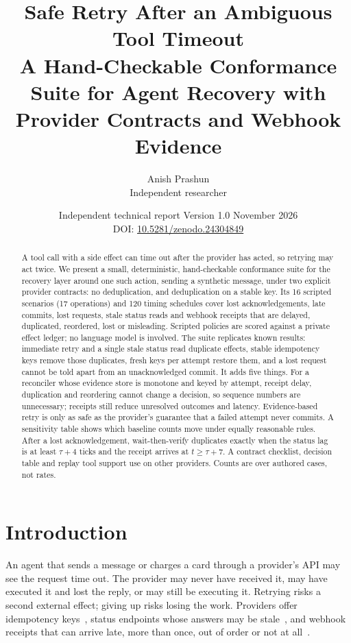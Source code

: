 \documentclass[11pt]{article}
\title{Safe Retry After an Ambiguous Tool Timeout\\[4pt]
\large A Hand-Checkable Conformance Suite for Agent Recovery with Provider Contracts and Webhook Evidence}
\author{Anish Prashun\\ \small Independent researcher}
\date{Independent technical report \quad Version 1.0 \quad November 2026\\[2pt] \small DOI: \href{https://doi.org/10.5281/zenodo.24304849}{10.5281/zenodo.24304849}}
\begin{document}
\maketitle

\begin{abstract}
A tool call with a side effect can time out after the provider has acted, so retrying may act twice. We present a small, deterministic, hand-checkable conformance suite for the recovery layer around one such action, sending a synthetic message, under two explicit provider contracts: no deduplication, and deduplication on a stable key. Its 16 scripted scenarios (17 operations) and 120 timing schedules cover lost acknowledgements, late commits, lost requests, stale status reads and webhook receipts that are delayed, duplicated, reordered, lost or misleading. Scripted policies are scored against a private effect ledger; no language model is involved. The suite replicates known results: immediate retry and a single stale status read duplicate effects, stable idempotency keys remove those duplicates, fresh keys per attempt restore them, and a lost request cannot be told apart from an unacknowledged commit. It adds five things. For a reconciler whose evidence store is monotone and keyed by attempt, receipt delay, duplication and reordering cannot change a decision, so sequence numbers are unnecessary; receipts still reduce unresolved outcomes and latency. Evidence-based retry is only as safe as the provider's guarantee that a failed attempt never commits. A sensitivity table shows which baseline counts move under equally reasonable rules. After a lost acknowledgement, wait-then-verify duplicates exactly when the status lag is at least $\tau+4$ ticks and the receipt arrives at $t \geq \tau+7$. A contract checklist, decision table and replay tool support use on other providers. Counts are over authored cases, not rates.
\end{abstract}

\section{Introduction}\label{sec:intro}

An agent that sends a message or charges a card through a provider's API may see the request time out. The provider may never have received it, may have executed it and lost the reply, or may still be executing it. Retrying risks a second external effect; giving up risks losing the work. Providers offer idempotency keys~\cite{stripeidem,aws}, status endpoints whose answers may be stale~\cite{vogels}, and webhook receipts that can arrive late, more than once, out of order or not at all~\cite{stripewebhooks,shopify}.
\end{document}
